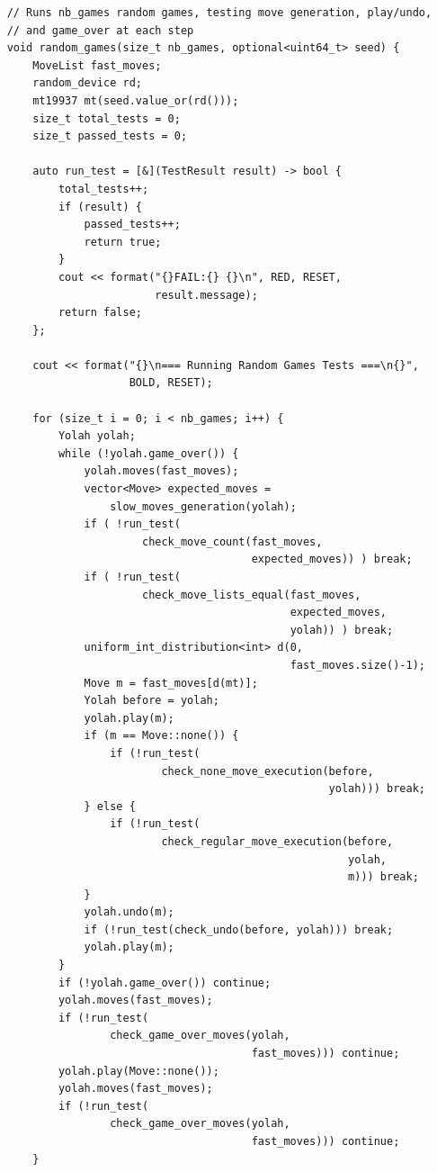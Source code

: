 \documentclass[12pt,a4paper,twoside,openright]{book}
\begin{document}
\begin{mdframed}[skipabove=\baselineskip,topline=false,rightline=false,bottomline=false,leftline=false,linewidth=1pt,linecolor=gray!40,innerleftmargin=8pt]
\begin{verbatim}
    // Runs nb_games random games, testing move generation, play/undo, 
    // and game_over at each step
    void random_games(size_t nb_games, optional<uint64_t> seed) {
        MoveList fast_moves;
        random_device rd;
        mt19937 mt(seed.value_or(rd()));
        size_t total_tests = 0;
        size_t passed_tests = 0;

        auto run_test = [&](TestResult result) -> bool {
            total_tests++;
            if (result) {
                passed_tests++;
                return true;
            }
            cout << format("{}FAIL:{} {}\n", RED, RESET, 
                           result.message);
            return false;
        };
        
        cout << format("{}\n=== Running Random Games Tests ===\n{}", 
                       BOLD, RESET);

        for (size_t i = 0; i < nb_games; i++) {
            Yolah yolah;
            while (!yolah.game_over()) {
                yolah.moves(fast_moves);
                vector<Move> expected_moves = 
                    slow_moves_generation(yolah);
                if ( !run_test(
                         check_move_count(fast_moves, 
                                          expected_moves)) ) break;
                if ( !run_test(
                         check_move_lists_equal(fast_moves, 
                                                expected_moves, 
                                                yolah)) ) break;
                uniform_int_distribution<int> d(0,
                                                fast_moves.size()-1);
                Move m = fast_moves[d(mt)];
                Yolah before = yolah;
                yolah.play(m);
                if (m == Move::none()) {
                    if (!run_test(
                            check_none_move_execution(before, 
                                                      yolah))) break;
                } else {
                    if (!run_test(
                            check_regular_move_execution(before, 
                                                         yolah, 
                                                         m))) break;
                }
                yolah.undo(m);
                if (!run_test(check_undo(before, yolah))) break;
                yolah.play(m);
            }
            if (!yolah.game_over()) continue;
            yolah.moves(fast_moves);
            if (!run_test(
                    check_game_over_moves(yolah, 
                                          fast_moves))) continue;
            yolah.play(Move::none());
            yolah.moves(fast_moves);
            if (!run_test(
                    check_game_over_moves(yolah, 
                                          fast_moves))) continue;
        }


\end{verbatim}
\end{mdframed}
\end{document}
